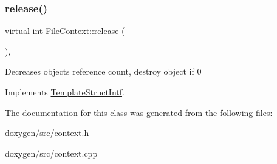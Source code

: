 \subsubsection{\texorpdfstring{release()}{release()}}
{\footnotesize\ttfamily virtual int File\+Context\+::release (\begin{DoxyParamCaption}{ }\end{DoxyParamCaption})\hspace{0.3cm}{\ttfamily [inline]}, {\ttfamily [virtual]}}

Decreases object\textquotesingle{}s reference count, destroy object if 0 

Implements \mbox{\hyperlink{class_template_struct_intf_a3dce7dd29d3f66a8080b40578e8a5045}{Template\+Struct\+Intf}}.



The documentation for this class was generated from the following files\+:\begin{DoxyCompactItemize}
\item 
doxygen/src/context.\+h\item 
doxygen/src/context.\+cpp\end{DoxyCompactItemize}
